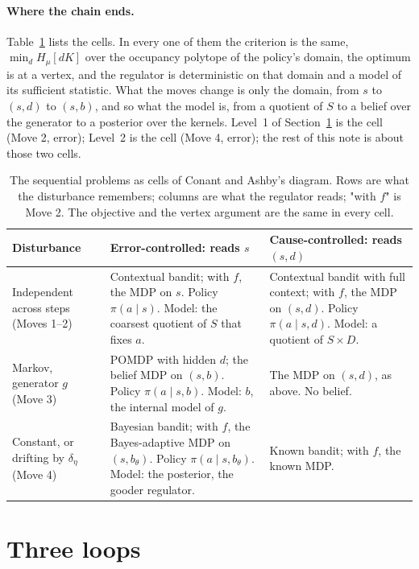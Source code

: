 \documentclass[10pt]{article}
\theoremstyle{plain}
\newcommand{\Hmu}[1]{H_\mu\!\left[#1\right]}
\begin{document}
\paragraph{Where the chain ends.}
Table~\ref{tab:cells} lists the cells.
In every one of them the criterion is the same, $\min_d \Hmu{dK}$ over the occupancy polytope of the policy's domain, the optimum is at a vertex, and the regulator is deterministic on that domain and a model of its sufficient statistic.
What the moves change is only the domain, from $s$ to $(s,d)$ to $(s,b)$, and so what the model is, from a quotient of $S$ to a belief over the generator to a posterior over the kernels.
Level~1 of Section~\ref{sec:loops} is the cell (Move 2, error); Level~2 is the cell (Move 4, error); the rest of this note is about those two cells.

\begin{table}[h]
\centering
\small
\begin{tabularx}{\textwidth}{@{}lXX@{}}
\toprule
Disturbance & Error-controlled: reads $s$ & Cause-controlled: reads $(s,d)$ \\
\midrule
Independent across steps (Moves 1--2) & Contextual bandit; with $f$, the MDP on $s$. Policy $\pi(a \mid s)$. Model: the coarsest quotient of $S$ that fixes $a$. & Contextual bandit with full context; with $f$, the MDP on $(s,d)$. Policy $\pi(a \mid s,d)$. Model: a quotient of $S \times D$. \\
Markov, generator $g$ (Move 3) & POMDP with hidden $d$; the belief MDP on $(s,b)$. Policy $\pi(a \mid s,b)$. Model: $b$, the internal model of $g$. & The MDP on $(s,d)$, as above. No belief. \\
Constant, or drifting by $\delta_\eta$ (Move 4) & Bayesian bandit; with $f$, the Bayes-adaptive MDP on $(s,b_\theta)$. Policy $\pi(a \mid s,b_\theta)$. Model: the posterior, the gooder regulator. & Known bandit; with $f$, the known MDP. \\
\bottomrule
\end{tabularx}
\caption{The sequential problems as cells of Conant and Ashby's diagram.
Rows are what the disturbance remembers; columns are what the regulator reads; "with $f$" is Move 2.
The objective and the vertex argument are the same in every cell.}
\label{tab:cells}
\end{table}

\section{Three loops}
\label{sec:loops}
\end{document}
